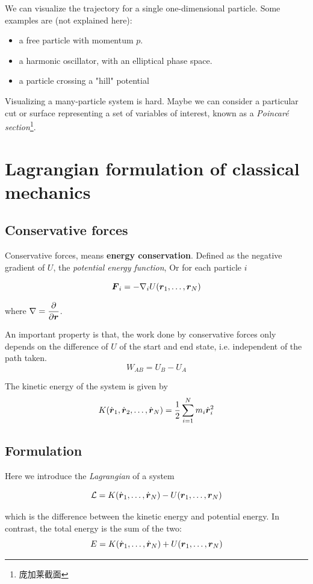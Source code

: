 We can visualize the trajectory for a single one-dimensional particle. Some examples are (not explained here):
\begin{itemize}
	\item a free particle with momentum $p$.
	\item a harmonic oscillator, with an elliptical phase space.
	\item a particle crossing a "hill" potential
\end{itemize}

Visualizing a many-particle system is hard. Maybe we can consider a particular cut or surface representing a set of variables of interest, known as a \textit{Poincar{\'e} section}\footnote{庞加莱截面}.

\section{Lagrangian formulation of classical mechanics}

\vspace{0.5em}
\subsection{Conservative forces}
Conservative forces, means \textbf{energy conservation}. Defined as the negative gradient of $U$, the \textit{potential energy function}, Or for each particle $i$
\begin{tcolorbox}
	\begin{equation}
		\boldsymbol{F}_i=-\nabla_i U(\boldsymbol{r}_1,\dots,\boldsymbol{r}_N) \label{eq:conservative}
	\end{equation}
\end{tcolorbox}
where $\nabla=\dfrac{\partial }{\partial \boldsymbol{r}}$. 

An important property is that, the work done by conservative forces only depends on the difference of $U$ of the start and end state, i.e. independent of the path taken. 
$$
W_{AB}=U_B-U_A
$$

The kinetic energy of the system is given by
\begin{equation}
	K(\dot{\boldsymbol{r}}_1, \dot{\boldsymbol{r}}_2, \dots, \dot{\boldsymbol{r}}_N)=\dfrac{1}{2}\sum_{i=1}^{N}m_i\dot{\boldsymbol{r}}_i^2 \label{eq:kinetics}
\end{equation}

\subsection{Formulation}
Here we introduce the \textit{Lagrangian} of a system
\begin{tcolorbox}
	\begin{equation}
		\mathcal{L}=K(\dot{\boldsymbol{r}}_1, \dots, \dot{\boldsymbol{r}}_N)-U(\boldsymbol{r}_1, \dots, \boldsymbol{r}_N)
	\end{equation}
\end{tcolorbox}
which is the difference between the kinetic energy and potential energy. In contrast, the total energy is the sum of the two:
\begin{equation}
	E=K(\dot{\boldsymbol{r}}_1, \dots, \dot{\boldsymbol{r}}_N)+U(\boldsymbol{r}_1, \dots, \boldsymbol{r}_N)
\end{equation}


